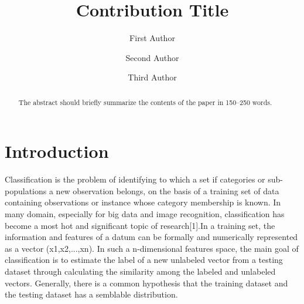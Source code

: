 \documentclass[runningheads]{llncs}
\begin{document}
%
\title{Contribution Title}
%
%
\author{First Author \and
Second Author \and
Third Author}
%
%
%
\maketitle              %
%
\begin{abstract}
The abstract should briefly summarize the contents of the paper in
150--250 words.

\end{abstract}
%
%
%
\section{Introduction}
Classification is the problem of identifying to which a set if categories or sub-populations a new observation belongs, on the basis of a training set of data containing observations or instance whose category membership is known. In many domain, especially for big data and image recognition, classification has become a most hot and significant topic of research[1].In a training set, the information and features of a datum can be formally and numerically represented as a vector (x1,x2,...,xn). In such a n-dimensional features space, the main goal of classification is to estimate the label of a new unlabeled vector from a testing dataset through calculating the similarity among the labeled and unlabeled vectors. Generally, there is a common hypothesis that the training dataset and the testing dataset has a semblable distribution. 
\end{document}
